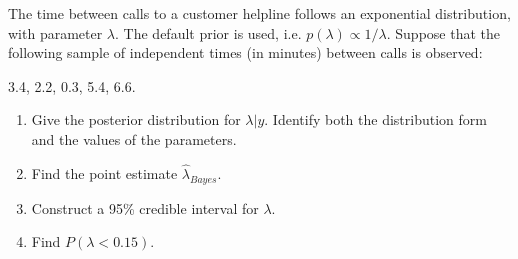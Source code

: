   \item The time between calls to a customer helpline follows an exponential distribution, with parameter $\lambda$. The default prior is used, i.e. $p(\lambda) \propto 1/ \lambda$.  Suppose that the following sample of independent times (in minutes) between calls is observed:
    
3.4, 2.2, 0.3, 5.4, 6.6. 
    
    \begin{enumerate}	 
      \item Give the posterior distribution for $\lambda | y$. Identify both the distribution form and the values of the parameters. 
      \item Find the point estimate $\hat{\lambda}_{Bayes}$. 
      \item Construct a 95\% credible interval for $\lambda$. 
      \item Find $P(\lambda<0.15)$.
\end{enumerate}
     
